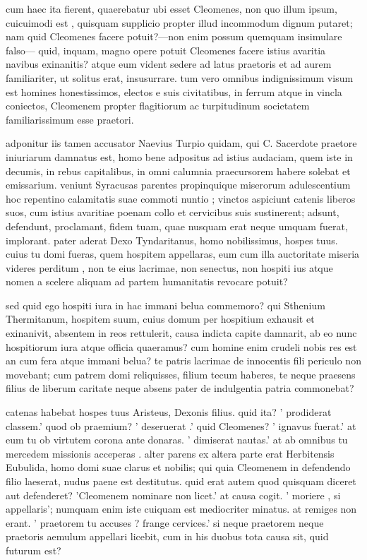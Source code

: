  cum haec ita fierent, quaerebatur ubi esset Cleomenes, non quo illum ipsum, cuicuimodi est , quisquam supplicio propter illud incommodum dignum putaret; nam quid Cleomenes facere potuit?—non enim possum quemquam insimulare falso— quid, inquam, magno opere potuit Cleomenes facere istius avaritia navibus exinanitis? atque eum vident sedere ad latus praetoris et ad aurem familiariter, ut solitus erat, insusurrare. tum vero omnibus indignissimum visum est homines honestissimos, electos e suis civitatibus, in ferrum atque in vincla coniectos, Cleomenem propter flagitiorum ac turpitudinum societatem familiarissimum esse praetori.

 adponitur iis tamen accusator Naevius Turpio quidam, qui C. Sacerdote praetore iniuriarum damnatus est, homo bene adpositus ad istius audaciam, quem iste in decumis, in rebus capitalibus, in omni calumnia praecursorem habere solebat et emissarium. veniunt Syracusas parentes propinquique miserorum adulescentium hoc repentino calamitatis suae commoti nuntio ; vinctos aspiciunt catenis liberos suos, cum istius avaritiae poenam collo et cervicibus suis sustinerent; adsunt, defendunt, proclamant, fidem tuam, quae nusquam erat neque umquam fuerat, implorant. pater aderat Dexo Tyndaritanus, homo nobilissimus, hospes tuus. cuius tu domi fueras, quem hospitem appellaras, eum cum illa auctoritate miseria videres perditum , non te eius lacrimae, non senectus, non hospiti ius atque nomen a scelere aliquam ad partem humanitatis revocare potuit?

 sed quid ego hospiti iura in hac immani belua commemoro? qui Sthenium Thermitanum, hospitem suum, cuius domum per hospitium exhausit et exinanivit, absentem in reos rettulerit, causa indicta capite damnarit, ab eo nunc hospitiorum iura atque officia quaeramus? cum homine enim crudeli nobis res est an cum fera atque immani belua? te patris lacrimae de innocentis fili periculo non movebant; cum patrem domi reliquisses, filium tecum haberes, te neque praesens filius de liberum caritate neque absens pater de indulgentia patria commonebat?

 catenas habebat hospes tuus Aristeus, Dexonis filius. quid ita? ' prodiderat classem.' quod ob praemium? ' deseruerat .' quid Cleomenes? ' ignavus fuerat.' at eum tu ob virtutem corona ante donaras. ' dimiserat nautas.' at ab omnibus tu mercedem missionis acceperas . alter parens ex altera parte erat Herbitensis Eubulida, homo domi suae clarus et nobilis; qui quia Cleomenem in defendendo filio laeserat, nudus paene est destitutus. quid erat autem quod quisquam diceret aut defenderet? 'Cleomenem nominare non licet.' at causa cogit. ' moriere , si appellaris'; numquam enim iste cuiquam est mediocriter minatus. at remiges non erant. ' praetorem tu accuses ? frange cervices.' si neque praetorem neque praetoris aemulum appellari licebit, cum in his duobus tota causa sit, quid futurum est?

